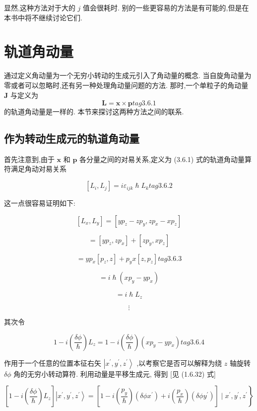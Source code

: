 显然,这种方法对于大的 $j$ 值会很耗时. 别的一些更容易的方法是有可能的,但是在本书中将不继续讨论它们.

\section{轨道角动量}
通过定义角动量为一个无穷小转动的生成元引入了角动量的概念. 当自旋角动量为零或者可以忽略时,还有另一种处理角动量问题的方法. 那时,一个单粒子的角动量 $\mathbf{J}$ 与定义为
$$
\mathbf{L} = \mathbf{x} \times \mathbf{p} tag{3.6.1}
$$
的轨道角动量是一样的. 本节来探讨这两种方法之间的联系.
\subsection{作为转动生成元的轨道角动量}

首先注意到,由于 $\mathbf{x}$ 和 $\mathbf{p}$ 各分量之间的对易关系,定义为 (3.6.1) 式的轨道角动量算符满足角动对易关系

$$
\left\lbrack {{L}_{i},{L}_{j}}\right\rbrack = i{\varepsilon }_{ijk}\hslash {L}_{k} tag{3.6.2}
$$

这一点很容易证明如下:

$$
\left\lbrack {{L}_{x},{L}_{y}}\right\rbrack = \left\lbrack {y{p}_{z} - z{p}_{y}, z{p}_{x} - x{p}_{z}}\right\rbrack
$$

$$
= \left\lbrack {y{p}_{z}, z{p}_{x}}\right\rbrack + \left\lbrack {z{p}_{y}, x{p}_{z}}\right\rbrack
$$

$$
= y{p}_{x}\left\lbrack {{p}_{z}, z}\right\rbrack + {p}_{y}x\left\lbrack {z,{p}_{z}}\right\rbrack tag{3.6.3}
$$

$$
= i\hslash \left( {x{p}_{y} - y{p}_{x}}\right)
$$

$$
= i\hslash {L}_{z}
$$

$$
\vdots
$$

其次令

$$
1 - i\left( \frac{\delta \phi }{\hslash }\right) {L}_{z} = 1 - i\left( \frac{\delta \phi }{\hslash }\right) \left( {x{p}_{y} - y{p}_{x}}\right) tag{3.6.4}
$$

作用于一个任意的位置本征右矢 $\left| {{x}^{\prime },{y}^{\prime },{z}^{\prime }}\right\rangle$ ,以考察它是否可以解释为绕 $z$ 轴旋转 ${\delta \phi }$ 角的无穷小转动算符. 利用动量是平移生成元, 得到 [见 (1.6.32) 式]

$$
\left. {\left\lbrack {1 - i\left( \frac{\delta \phi }{\hslash }\right) {L}_{z}}\right\rbrack \left| {{x}^{\prime },{y}^{\prime },{z}^{\prime }}\right\rangle = \left\lbrack {1 - i\left( \frac{{p}_{y}}{\hslash }\right) \left( {{\delta \phi }{x}^{\prime }}\right) + i\left( \frac{{p}_{x}}{\hslash }\right) \left( {{\delta \phi }{y}^{\prime }}\right) }\right\rbrack \mid {x}^{\prime },{y}^{\prime },{z}^{\prime }}\right\}
$$

